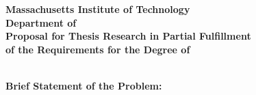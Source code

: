 

\begin{center}
{\Large \bf 
   Massachusetts Institute of Technology
\\ Department of \deptname \\}
\vspace{.25in}
{\Large \bf
   Proposal for Thesis Research in Partial Fulfillment
\\ of the Requirements for the Degree of
\\ \degree \\}
\end{center}

\vspace{.5in}

\def\sig{{\small \sc (Signature of Author)}}



\vspace{.75in}
{\bf \sc Brief Statement of the Problem:}

